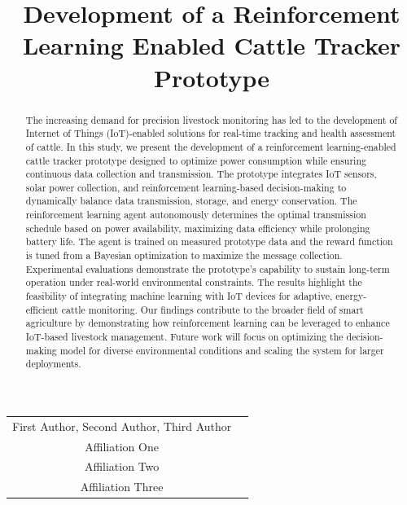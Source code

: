 \documentclass[10pt]{cai}
\begin{document}
\def\conferenceyear{2025}
\begin{center}

\title{Development of a Reinforcement Learning Enabled Cattle Tracker Prototype}
\maketitle

\thispagestyle{empty}

\begin{tabular}{cc}
First Author\upstairs{\affilone,*}, Second Author\upstairs{\affilone}, Third Author\upstairs{\affilthree}
\\[0.25ex]
{\small \upstairs{\affilone} Affiliation One} \\
{\small \upstairs{\affiltwo} Affiliation Two} \\
{\small \upstairs{\affilthree} Affiliation Three} \\
\end{tabular}
  
\vspace*{0.2in}
\end{center}

\begin{abstract}
The increasing demand for precision livestock monitoring has led to the development of Internet of Things (IoT)-enabled solutions for real-time tracking and health assessment of cattle. 
In this study, we present the development of a reinforcement learning-enabled cattle tracker prototype designed to optimize power consumption while ensuring continuous data collection and transmission. 
The prototype integrates IoT sensors, solar power collection, and reinforcement learning-based decision-making to dynamically balance data transmission, storage, and energy conservation. 
The reinforcement learning agent autonomously determines the optimal transmission schedule based on power availability, maximizing data efficiency while prolonging battery life. 
The agent is trained on measured prototype data and the reward function is tuned from a Bayesian optimization to maximize the message collection.
Experimental evaluations demonstrate the prototype's capability to sustain long-term operation under real-world environmental constraints. 
The results highlight the feasibility of integrating machine learning with IoT devices for adaptive, energy-efficient cattle monitoring.
Our findings contribute to the broader field of smart agriculture by demonstrating how reinforcement learning can be leveraged to enhance IoT-based livestock management. 
Future work will focus on optimizing the decision-making model for diverse environmental conditions and scaling the system for larger deployments.

\end{abstract}
\end{document}
